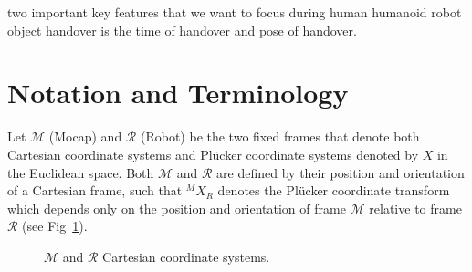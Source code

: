 two important key features that we want to focus during human humanoid robot object handover is the time of handover and pose of handover.


\newpage
\section{Notation and Terminology}
Let $\mathcal{M}$ (Mocap) and $\mathcal{R}$ (Robot) be the two fixed frames that denote both Cartesian coordinate systems and Pl\"ucker coordinate systems denoted by $X$ in the Euclidean space. Both $\mathcal{M}$ and $\mathcal{R}$ are defined by their position and orientation of a Cartesian frame, such that ${}^MX_R$ denotes the Pl\"ucker coordinate transform which depends only on the position and orientation of frame $\mathcal{M}$ relative to frame $\mathcal{R}$\cite{featherstone2014rigid} (see Fig~\ref{fig:frames}).


\begin{figure}[h]
	\caption{$\mathcal{M}$ and $\mathcal{R}$ Cartesian coordinate systems.}
	\label{fig:frames}
\end{figure}


